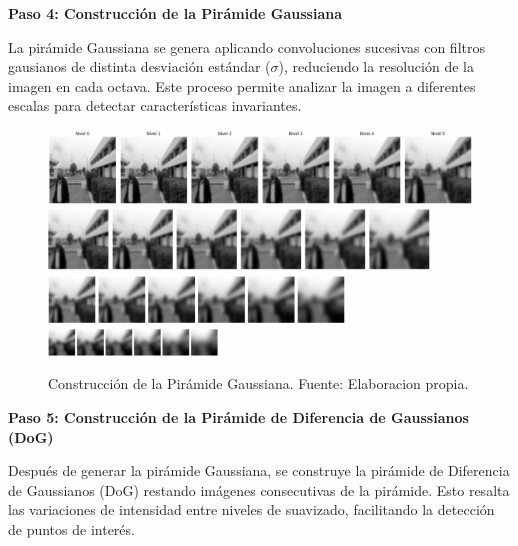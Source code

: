 \documentclass[a4paper]{article}
\begin{document}
\textbf{Paso 4: Construcción de la Pirámide Gaussiana}
\par\vspace{0.5cm}

La pirámide Gaussiana se genera aplicando convoluciones sucesivas con filtros gausianos de distinta desviación estándar (\(\sigma\)), reduciendo la resolución de la imagen en cada octava. Este proceso permite analizar la imagen a diferentes escalas para detectar características invariantes.

\begin{figure}[H]
    \centering
    \includegraphics[width=1.1\textwidth]{images/sift_paso_3.1.png}
    \includegraphics[width=0.9\textwidth]{images/sift_paso_3.2.png}
    \includegraphics[width=0.7\textwidth]{images/sift_paso_3.3.png}
    \includegraphics[width=0.4\textwidth]{images/sift_paso_3.4.png}
    \caption{Construcción de la Pirámide Gaussiana. Fuente: Elaboracion propia.}
\end{figure}

\textbf{Paso 5: Construcción de la Pirámide de Diferencia de Gaussianos (DoG)}

Después de generar la pirámide Gaussiana, se construye la pirámide de Diferencia de Gaussianos (DoG) restando imágenes consecutivas de la pirámide. Esto resalta las variaciones de intensidad entre niveles de suavizado, facilitando la detección de puntos de interés.
\end{document}

